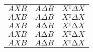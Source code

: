 \documentclass{standalone}
\begin{document}
\begin{tabular}{lll}
   $AXB$    & $A \Delta B$     & $Xᵀ\Delta X$
\\ $A X B$  & $A{\Delta}B$     & $Xᵀ{\Delta X}$
\\ $A{X}B$  & $A∆B$     & $Xᵀ∆X$
\\ $A{X}B$  & $A{∆B}$     & $Xᵀ{∆X}$
\\ $A{X}B$  & $A{∆B}$     & $Xᵀ\!{∆\!X}$
\end{tabular}
\end{document}
